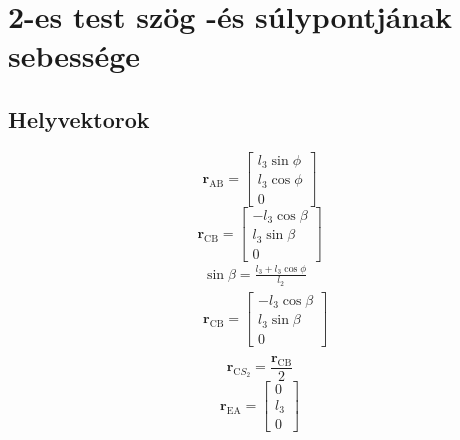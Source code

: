 \section{2-es test szög -és súlypontjának sebessége}

\subsection{Helyvektorok}
\begin{equation}
	\pmb{r}_\text{AB} =
	\begin{bmatrix}
		l_3 \sin\phi \\ l_3 \cos\phi \\ 0
	\end{bmatrix}
\end{equation}
\begin{equation}
	\pmb{r}_\text{CB} =
	\begin{bmatrix}
		-l_3 \cos\beta \\ l_3 \sin\beta \\ 0
	\end{bmatrix}
\end{equation}
\begin{align}
	&\sin\beta = \frac{l_3 + l_3\cos\phi}{l_2} \\
	&\pmb{r}_\text{CB} =
	\begin{bmatrix}
		-l_3 \cos\beta \\ l_3 \sin\beta \\ 0
	\end{bmatrix} \\
\end{align}
\begin{equation}
	\pmb{r}_{\text{C}{S_2}} = \frac{\pmb{r}_\text{CB}}{2}
\end{equation}
\begin{equation}
	\pmb{r}_\text{EA} = 
	\begin{bmatrix}
		0 \\ l_3 \\ 0
	\end{bmatrix}
\end{equation}

